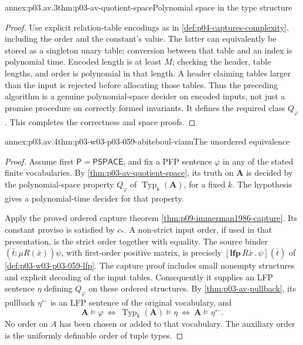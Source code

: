 \begin{annexitem}{annex:p03.av.3}{thm:p03-av-quotient-space}{Polynomial space in the type structure}
\begin{proof}
Use explicit relation-table encodings as in
\cref{def:p04-captures-complexity}, including the order and the
constant's value. The latter can equivalently be stored as a
singleton unary table; conversion between that table and an index
is polynomial time. Encoded length is at least \(M\); checking
the header, table lengths, and order is polynomial in that length.
A header claiming tables larger than the input is rejected before
allocating those tables. Thus the preceding algorithm is a genuine
polynomial-space decider on encoded inputs, not just a promise
procedure on correctly formed invariants. It defines the required
class \(Q_\varphi\). This completes the correctness and space
proofs.
\end{proof}
\end{annexitem}

\begin{annexitem}{annex:p03.av.4}{thm:p03-w03-p03-059-abiteboul-vianu}{The unordered equivalence}
\begin{proof}
Assume first \(\mathsf P=\mathsf{PSPACE}\), and fix a PFP
sentence \(\varphi\) in any of the stated finite vocabularies.
By \cref{thm:p03-av-quotient-space}, its truth on
\(\mathbf A\) is decided by the polynomial-space property
\(Q_\varphi\) of \(\operatorname{Typ}_k(\mathbf A)\), for a
fixed \(k\). The hypothesis gives a polynomial-time decider
for that property.

Apply the proved ordered capture theorem
\cref{thm:p09-immerman1986-capture}. Its constant proviso is
satisfied by \(c_\ast\). A non-strict input order, if used in
that presentation, is the strict order together with equality.
The source binder \((\bar t:\mu R(\bar x))\psi\), with
first-order positive matrix, is precisely
\([\mathbf{lfp}\,R\bar x\,.\,\psi](\bar t)\) of
\cref{def:p03-w03-p03-059-lfp}. The capture proof includes
small nonempty structures and explicit decoding of the input tables.
Consequently it supplies an LFP sentence \(\eta\) defining
\(Q_\varphi\) on these ordered structures. By
\cref{thm:p03-av-pullback}, its pullback \(\eta^{\leftarrow}\)
is an LFP sentence of the original vocabulary, and
\[
 \mathbf A\models\varphi
 \ \Longleftrightarrow\
 \operatorname{Typ}_k(\mathbf A)\models\eta
 \ \Longleftrightarrow\
 \mathbf A\models\eta^{\leftarrow}.
\]
No order on \(A\) has been chosen or added to that vocabulary.
The auxiliary order is the uniformly definable order of tuple types.


\end{proof}
\end{annexitem}
